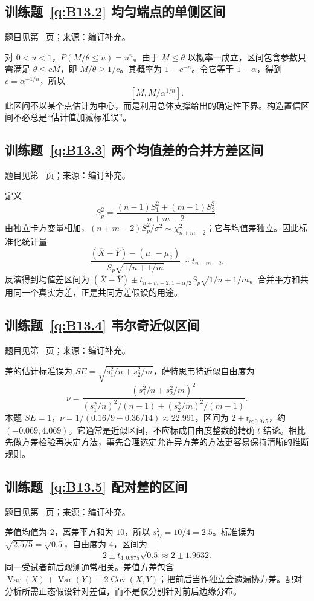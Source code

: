 \documentclass[UTF8,12pt,a4paper,fontset=fandol]{ctexbook}
\begin{document}
\subsection*{训练题~\ref{q:B13.2} 均匀端点的单侧区间}\label{a:B13.2}{\small 题目见第~\pageref{q:B13.2} 页；来源：编订补充。}
\begin{solve}对 $0<u<1$，$P(M/\theta\le u)=u^n$。由于 $M\le\theta$ 以概率一成立，区间包含参数只需满足 $\theta\le cM$，即 $M/\theta\ge1/c$。其概率为 $1-c^{-n}$。令它等于 $1-\alpha$，得到 $c=\alpha^{-1/n}$，所以\[[M,M/\alpha^{1/n}].\]此区间不以某个点估计为中心，而是利用总体支撑给出的确定性下界。构造置信区间不必总是“估计值加减标准误”。\end{solve}

\subsection*{训练题~\ref{q:B13.3} 两个均值差的合并方差区间}\label{a:B13.3}{\small 题目见第~\pageref{q:B13.3} 页；来源：编订补充。}
\begin{solve}定义\[S_p^2=\frac{(n-1)S_1^2+(m-1)S_2^2}{n+m-2}.\]由独立卡方变量相加，$(n+m-2)S_p^2/\sigma^2\sim\chi^2_{n+m-2}$；它与均值差独立。因此标准化统计量\[\frac{(\overline X-\overline Y)-(\mu_1-\mu_2)}{S_p\sqrt{1/n+1/m}}\sim t_{n+m-2}.\]反演得到均值差区间为 $(\overline X-\overline Y)\pm t_{n+m-2;1-\alpha/2}S_p\sqrt{1/n+1/m}$。合并平方和共用同一个真实方差，正是共同方差假设的用途。\end{solve}

\subsection*{训练题~\ref{q:B13.4} 韦尔奇近似区间}\label{a:B13.4}{\small 题目见第~\pageref{q:B13.4} 页；来源：编订补充。}
\begin{solve}差的估计标准误为 $SE=\sqrt{s_1^2/n+s_2^2/m}$，萨特思韦特近似自由度为\[\nu=\frac{(s_1^2/n+s_2^2/m)^2}{(s_1^2/n)^2/(n-1)+(s_2^2/m)^2/(m-1)}.\]本题 $SE=1$，$\nu=1/(0.16/9+0.36/14)\approx22.991$，区间为 $2\pm t_{\nu;0.975}$，约 $(-0.069,4.069)$。它通常是近似区间，不应标成自由度整数的精确 $t$ 结论。相比先做方差检验再决定方法，事先合理选定允许异方差的方法更容易保持清晰的推断规则。\end{solve}

\subsection*{训练题~\ref{q:B13.5} 配对差的区间}\label{a:B13.5}{\small 题目见第~\pageref{q:B13.5} 页；来源：编订补充。}
\begin{solve}差值均值为 $2$，离差平方和为 $10$，所以 $s_D^2=10/4=2.5$。标准误为 $\sqrt{2.5/5}=\sqrt{0.5}$，自由度为 $4$，区间为\[2\pm t_{4;0.975}\sqrt{0.5}\approx2\pm1.9632.\]同一受试者前后观测通常相关。差值方差包含 $\operatorname{Var}(X)+\operatorname{Var}(Y)-2\operatorname{Cov}(X,Y)$；把前后当作独立会遗漏协方差。配对分析所需正态假设针对差值，而不是仅分别针对前后边缘分布。\end{solve}
\end{document}
